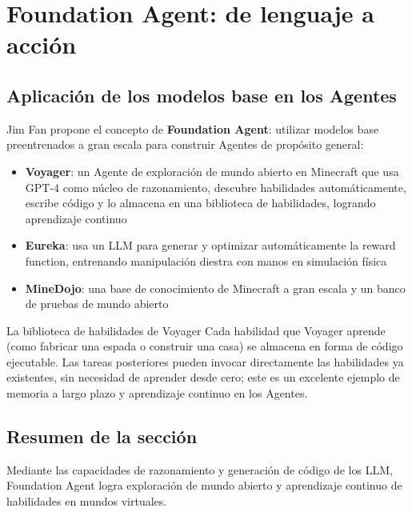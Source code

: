 \section{Foundation Agent: de lenguaje a acción}

\subsection{Aplicación de los modelos base en los Agentes}

Jim Fan propone el concepto de \textbf{Foundation Agent}: utilizar modelos base preentrenados a gran escala para construir Agentes de propósito general:

\begin{itemize}
    \item \textbf{Voyager}: un Agente de exploración de mundo abierto en Minecraft que usa GPT-4 como núcleo de razonamiento, descubre habilidades automáticamente, escribe código y lo almacena en una biblioteca de habilidades, logrando aprendizaje continuo
    \item \textbf{Eureka}: usa un LLM para generar y optimizar automáticamente la reward function, entrenando manipulación diestra con manos en simulación física
    \item \textbf{MineDojo}: una base de conocimiento de Minecraft a gran escala y un banco de pruebas de mundo abierto
\end{itemize}

\begin{knowledgebox}{La biblioteca de habilidades de Voyager}
Cada habilidad que Voyager aprende (como fabricar una espada o construir una casa) se almacena en forma de código ejecutable. Las tareas posteriores pueden invocar directamente las habilidades ya existentes, sin necesidad de aprender desde cero; este es un excelente ejemplo de memoria a largo plazo y aprendizaje continuo en los Agentes.
\end{knowledgebox}

\subsection{Resumen de la sección}

Mediante las capacidades de razonamiento y generación de código de los LLM, Foundation Agent logra exploración de mundo abierto y aprendizaje continuo de habilidades en mundos virtuales.

